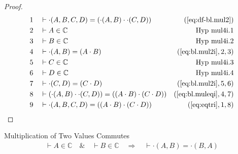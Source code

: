 \begin{proof}
\begin{align}
  1 &&  & \vdash \cdot( A , B , C , D ) = ( \cdot( A , B ) \cdot \cdot( C , D )
     )&(\mbox{\ref{eq:df-bl.mul2}})\notag
  \\ 2 &&  & \vdash A \in \mathbb{C}&\text{Hyp~mul4i.1}\notag%
  \\ 3 &&  & \vdash B \in \mathbb{C}&\text{Hyp~mul4i.2}\notag%
  \\ 4 &&  & \vdash \cdot( A , B ) = ( A \cdot B
     )&(\mbox{\ref{eq:bl.mul2i}},2,3)\notag
  \\ 5 &&  & \vdash C \in \mathbb{C}&\text{Hyp~mul4i.3}\notag%
  \\ 6 &&  & \vdash D \in \mathbb{C}&\text{Hyp~mul4i.4}\notag%
  \\ 7 &&  & \vdash \cdot( C , D ) = ( C \cdot D
     )&(\mbox{\ref{eq:bl.mul2i}},5,6)\notag
  \\ 8 &&  & \vdash ( \cdot( A , B ) \cdot \cdot( C , D ) ) = ( ( A \cdot B )
     \cdot ( C \cdot D )
     )&(\mbox{\ref{eq:bl.muleqi}},4,7)\notag
  \\ 9 &&  & \vdash \cdot( A , B , C , D ) = ( ( A \cdot B ) \cdot ( C \cdot D
     ) )&(\mbox{\ref{eq:eqtri}},1,8)\notag
\end{align}
\end{proof}

\begin{lemma} {Multiplication of Two Values Commutes}
\begin{align}
\vdash A \in \mathbb{C}\quad\&\quad \vdash B \in
    \mathbb{C}\quad\Rightarrow\quad \vdash \cdot( A , B ) = \cdot( B , A
    )\label{eq:bl.mulcom2}\tag{bl.mulcom2}
\end{align}
\end{lemma}


